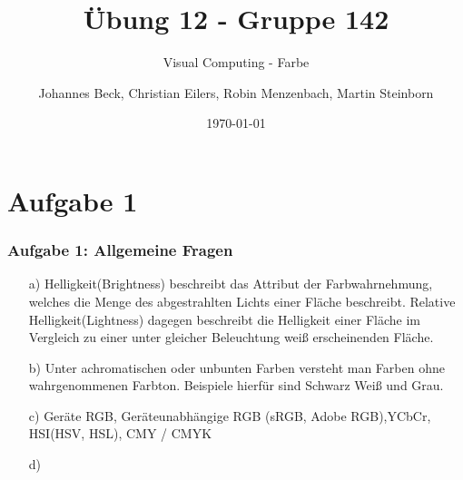 \documentclass[accentcolor=tud9c,colorbacktitle,inverttitle,landscape,german,presentation,t]{tudbeamer}
\begin{document}
\title{\"Ubung 12 - Gruppe 142}
\subtitle{Visual Computing - Farbe}


\author[Johannes Beck, Christian Eilers, Robin Menzenbach, Martin Steinborn]{Johannes Beck, Christian Eilers, Robin Menzenbach, Martin Steinborn}


\date{\today}

\begin{titleframe}
\end{titleframe}

\section{Aufgabe 1} 
	\begin{frame}
		\frametitle{Aufgabe 1: Allgemeine Fragen}
		\begin{itemize}
			\item[a)]%
				Helligkeit(Brightness) beschreibt das Attribut der Farbwahrnehmung, welches die Menge des abgestrahlten Lichts einer Fläche beschreibt. Relative Helligkeit(Lightness) dagegen beschreibt die Helligkeit einer Fläche im Vergleich zu einer unter gleicher Beleuchtung weiß erscheinenden Fläche.
			\item[b)]%
				Unter achromatischen oder unbunten Farben versteht man Farben ohne wahrgenommenen Farbton. Beispiele hierfür sind Schwarz Weiß und Grau.
			\item[c)]%
				Geräte RGB, Geräteunabhängige RGB (sRGB, Adobe RGB),YCbCr, HSI(HSV, HSL), CMY / CMYK %
			\item[d)]%
				
		\end{itemize}
	\end{frame}
\end{document}
